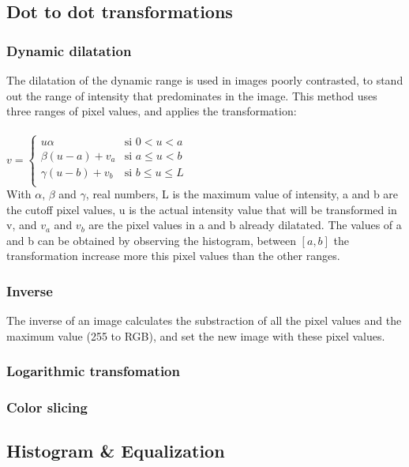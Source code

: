 \documentclass[a4paper]{article}
\begin{document}
\subsection{Dot to dot transformations}


\subsubsection{Dynamic dilatation}

The dilatation of the dynamic range is used in images poorly contrasted, to stand out the range of intensity that predominates in the image. This method uses three ranges of pixel values, and applies the transformation:\\ 
\\
\begin{math}
v= \left\{
	\begin{array}{cl}
		u\alpha & \mbox{si } 0<u<a\\
		\beta(u-a)+v_a &\mbox{si } a\leq u<b\\
	\gamma(u-b)+v_b &\mbox{si } b\leq u\leq L\\
	\end{array}\right.
\end{math}
\\
With $\alpha$, $\beta$ and $\gamma$, real numbers, L is the maximum value of intensity, a and b are the cutoff pixel values, u is the actual intensity value that will be transformed in v, and $v_a$ and $v_b$ are the pixel values in a and b already dilatated.
The values of a and b can be obtained by observing the histogram, between $\left[a,b\right]$ the transformation increase more this pixel values than the other ranges.
\subsubsection{Inverse}

The inverse of an image calculates the substraction of all the pixel values and the maximum value (255 to RGB), and set the new image with these pixel values.

\subsubsection{Logarithmic transfomation}
\subsubsection{Color slicing}

\subsection{Histogram \& Equalization }
\end{document}
